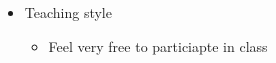 {\begin{itemize}
\begin{itemize}
\item Understand different programming paradigms

\item Learn new programming languages faster

\end{itemize}

\item Teaching style

\begin{itemize}

\item Feel very free to particiapte in class

\end{itemize}

\end{itemize}

}